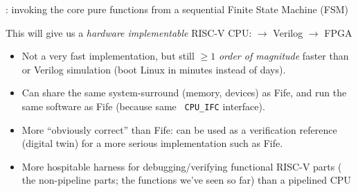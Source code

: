 \begin{frame}[fragile]

\begin{center}

  \vstrut{0em}{10ex}

  {\LARGE {\DRUM}: invoking the core pure functions from a sequential Finite State Machine (FSM)}

  \vspace*{5ex}

  This will give us a \emph{hardware implementable} RISC-V CPU:
  \hm {\BSV} $\longrightarrow$ Verilog $\longrightarrow$ FPGA

   \vspace*{5ex}

  \begin{minipage}{0.8\textwidth}
   \begin{itemize}\scriptsize

    \item Not a very fast implementation, but still $\geq 1$
      \emph{order of magnitude} faster than {\BLUESIM} or Verilog
      simulation (boot Linux in minutes instead of days).

    \vspace*{1ex}

    \item Can share the same system-surround (memory, devices) as
      Fife, and run the same software as Fife (because same {\tt
      CPU\_IFC} interface).
    
    \vspace*{1ex}

    \item More ``obviously correct'' than Fife: can be used as a
      verification reference (digital twin) for a more serious
      implementation such as Fife.

    \vspace*{1ex}

    \item More hospitable harness for debugging/verifying functional
      RISC-V parts ({\ie} the non-pipeline parts; the functions we've
      seen so far) than a pipelined CPU

   \end{itemize}
  \end{minipage}

\end{center}

\end{frame}

